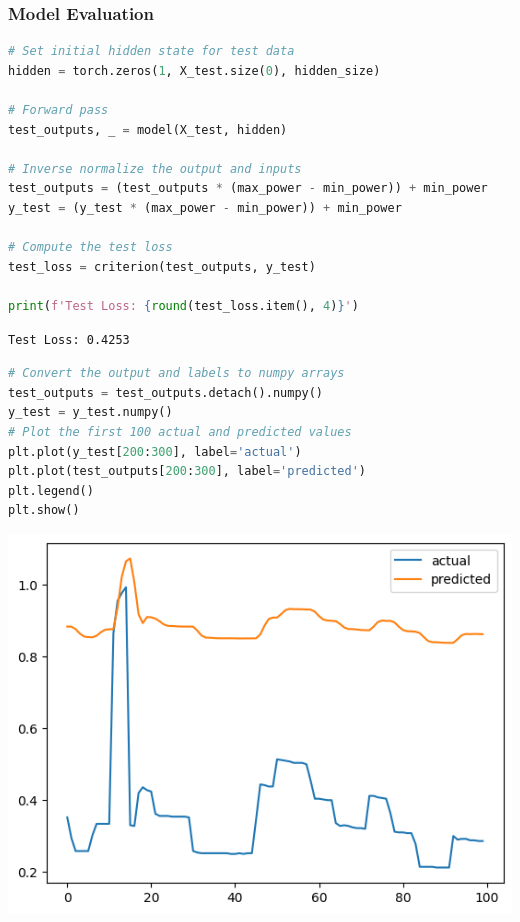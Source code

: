 \subsubsection{Model Evaluation}\label{model-evaluation}

\begin{lstlisting}[language=Python]
# Set initial hidden state for test data
hidden = torch.zeros(1, X_test.size(0), hidden_size)

# Forward pass
test_outputs, _ = model(X_test, hidden)

# Inverse normalize the output and inputs
test_outputs = (test_outputs * (max_power - min_power)) + min_power
y_test = (y_test * (max_power - min_power)) + min_power

# Compute the test loss
test_loss = criterion(test_outputs, y_test)

print(f'Test Loss: {round(test_loss.item(), 4)}')
\end{lstlisting}

\begin{lstlisting}
Test Loss: 0.4253
\end{lstlisting}

\begin{lstlisting}[language=Python]
# Convert the output and labels to numpy arrays
test_outputs = test_outputs.detach().numpy()
y_test = y_test.numpy()
# Plot the first 100 actual and predicted values
plt.plot(y_test[200:300], label='actual')
plt.plot(test_outputs[200:300], label='predicted')
plt.legend()
plt.show()
\end{lstlisting}

\includegraphics{img/rnn/intro/output_16_0_household.png}


\begin{lstlisting}[language=Python]
\end{lstlisting}
